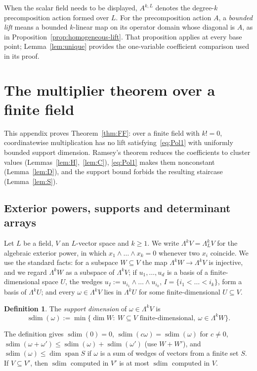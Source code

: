 \documentclass[11pt]{amsart}
\theoremstyle{definition}
\newtheorem{definition}[theorem]{Definition}
\theoremstyle{remark}
\numberwithin{equation}{section}
\newcommand{\spn}{\operatorname{span}}
\newcommand{\sdim}{\operatorname{sdim}}
\theoremstyle{plain}
\theoremstyle{definition}
\theoremstyle{plain}
\begin{document}
When the scalar field needs to be displayed, $A^{k,L}$ denotes the degree-$k$ precomposition action formed over $L$. For the precomposition action $A$, a \emph{bounded lift} means a bounded $k$\nobreakdash-linear map on its operator domain whose diagonal is $A$, as in Proposition~\ref{prop:homogeneous-lift}. That proposition applies at every base point; Lemma~\ref{lem:unique} provides the one-variable coefficient comparison used in its proof.
\section{The multiplier theorem over a finite field}\label{app:FF}\label{sec:FF}

This appendix proves Theorem~\ref{thm:FF}: over a finite field with $k!=0$, coordinatewise multiplication has no lift
satisfying~\eqref{eq:Pol1} with uniformly bounded support dimension. Ramsey's theorem reduces the coefficients to
cluster values (Lemmas~\ref{lem:H},~\ref{lem:C}), \eqref{eq:Pol1} makes them nonconstant (Lemma~\ref{lem:D}), and the
support bound forbids the resulting staircase (Lemma~\ref{lem:S}).

\subsection{Exterior powers, supports and determinant arrays}\label{ssec:ext}
Let $L$ be a field, $V$ an $L$\nobreakdash-vector space and $k\ge1$. We write $\Lambda^kV=\Lambda^k_LV$ for the algebraic exterior
power, in which $x_1\wedge\dots\wedge x_k=0$ whenever two $x_i$ coincide. We use the standard facts: for a subspace
$W\subseteq V$ the map $\Lambda^kW\to\Lambda^kV$ is injective, and we regard $\Lambda^kW$ as a subspace of $\Lambda^kV$;
if $u_1,\dots,u_d$ is a basis of a finite-dimensional space $U$, the wedges $u_I:=u_{i_1}\wedge\dots\wedge u_{i_k}$,
$I=\{i_1<\dots<i_k\}$, form a basis of $\Lambda^kU$; and every $\omega\in\Lambda^kV$ lies in $\Lambda^kU$ for some
finite-dimensional $U\subseteq V$.

\begin{definition}\label{def:supp}
The \emph{support dimension} of $\omega\in\Lambda^kV$ is
\[
\sdim(\omega):=\min\{\dim W:\ W\subseteq V\text{ finite-dimensional},\ \omega\in\Lambda^kW\}.
\]
\end{definition}

The definition gives $\sdim(0)=0$, $\sdim(c\omega)=\sdim(\omega)$ for $c\neq0$, $\sdim(\omega+\omega')\le\sdim(\omega)+\sdim(\omega')$
(use $W+W'$), and $\sdim(\omega)\le\dim\spn S$ if $\omega$ is a sum of wedges of vectors from a finite set $S$. If
$V\subseteq V'$, then $\sdim$ computed in $V'$ is at most $\sdim$ computed in $V$.
\end{document}

